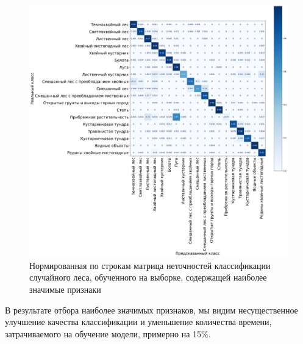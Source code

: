 \documentclass[14pt, a4paper, oneside]{extarticle}
\begin{document}
\begin{figure}[H]
    \caption{Нормированная по строкам матрица неточностей классификации случайного леса, обученного на выборке, содержащей наиболее значимые признаки}
    \centering
    \includegraphics[scale=0.33]{confusion-matrix-6}
\end{figure}

В результате отбора наиболее значимых признаков, мы видим несущественное улучшение качества классификации и уменьшение количества времени, затрачиваемого на обучение модели, примерно на 15\%.

\newpage



\end{document}
